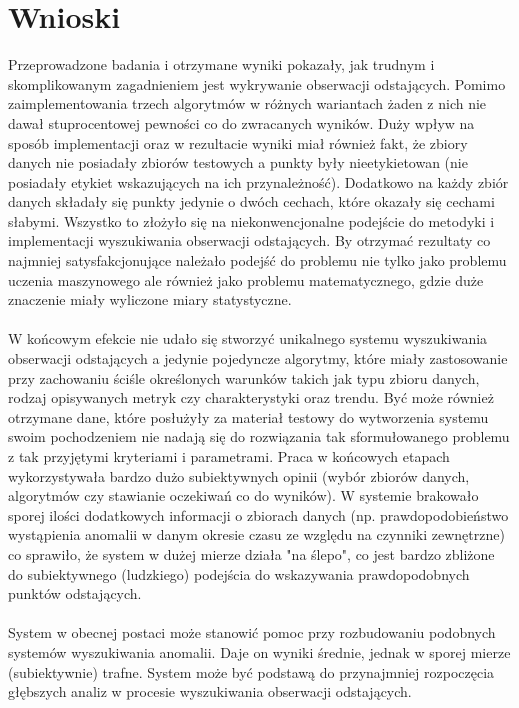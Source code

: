 \documentclass[eng,printmode]{mgr}
\begin{document}
\section{Wnioski}
Przeprowadzone badania i otrzymane wyniki pokazały, jak trudnym i skomplikowanym zagadnieniem jest wykrywanie obserwacji odstających. Pomimo zaimplementowania trzech algorytmów w różnych wariantach żaden z nich nie dawał stuprocentowej pewności co do zwracanych wyników. Duży wpływ na sposób implementacji oraz w rezultacie wyniki miał również fakt, że zbiory danych nie posiadały zbiorów testowych a punkty były nieetykietowan (nie posiadały etykiet wskazujących na ich przynależność). Dodatkowo na każdy zbiór danych składały się punkty jedynie o dwóch cechach, które okazały się cechami słabymi. Wszystko to złożyło się na niekonwencjonalne podejście do metodyki i implementacji wyszukiwania obserwacji odstających. By otrzymać rezultaty co najmniej satysfakcjonujące należało podejść do problemu nie tylko jako problemu uczenia maszynowego ale również jako problemu matematycznego, gdzie duże znaczenie miały wyliczone miary statystyczne.
\\\\
W końcowym efekcie nie udało się stworzyć unikalnego systemu wyszukiwania obserwacji odstających a jedynie pojedyncze algorytmy, które miały zastosowanie przy zachowaniu ściśle określonych warunków takich jak typu zbioru danych, rodzaj opisywanych metryk czy charakterystyki oraz trendu. Być może również otrzymane dane, które posłużyły za materiał testowy do wytworzenia systemu swoim pochodzeniem nie nadają się do rozwiązania tak sformułowanego problemu z tak przyjętymi kryteriami i parametrami. Praca w końcowych etapach wykorzystywała bardzo dużo subiektywnych opinii (wybór zbiorów danych, algorytmów czy stawianie oczekiwań co do wyników). W systemie brakowało sporej ilości dodatkowych informacji o zbiorach danych (np. prawdopodobieństwo wystąpienia anomalii w danym okresie czasu ze względu na czynniki zewnętrzne) co sprawiło, że system w dużej mierze działa "na ślepo", co jest bardzo zbliżone do subiektywnego (ludzkiego) podejścia do wskazywania prawdopodobnych punktów odstających.
\\\\
System w obecnej postaci może stanowić pomoc przy rozbudowaniu podobnych systemów wyszukiwania anomalii. Daje on wyniki średnie, jednak w sporej mierze (subiektywnie) trafne. System może być podstawą do przynajmniej rozpoczęcia głębszych analiz w procesie wyszukiwania obserwacji odstających.
\end{document}
